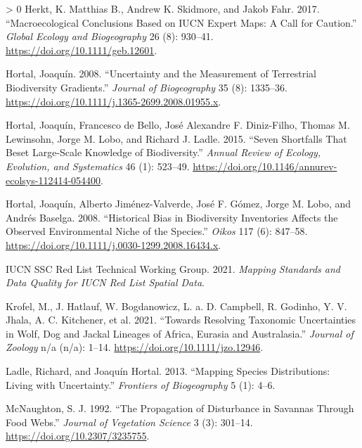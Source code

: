\documentclass[11pt]{article}
\newlength{\cslhangindent}
\newenvironment{CSLReferences}[3] %
 {%
  \setlength{\parindent}{0pt}
  \ifodd #1 \everypar{\setlength{\hangindent}{\cslhangindent}}\ignorespaces\fi
  \ifnum #2 > 0
  \setlength{\parskip}{#2\baselineskip}
  \fi
 }%
 {}
\begin{document}
\begin{CSLReferences}{1}{0}
\leavevmode\hypertarget{ref-Herkt2017MacCon}{}%
Herkt, K. Matthias B., Andrew K. Skidmore, and Jakob Fahr. 2017.
{``Macroecological Conclusions Based on IUCN Expert Maps: A Call for
Caution.''} \emph{Global Ecology and Biogeography} 26 (8): 930--41.
\url{https://doi.org/10.1111/geb.12601}.

\leavevmode\hypertarget{ref-Hortal2008UncMea}{}%
Hortal, Joaquín. 2008. {``Uncertainty and the Measurement of Terrestrial
Biodiversity Gradients.''} \emph{Journal of Biogeography} 35 (8):
1335--36. \url{https://doi.org/10.1111/j.1365-2699.2008.01955.x}.

\leavevmode\hypertarget{ref-Hortal2015SevSho}{}%
Hortal, Joaquín, Francesco de Bello, José Alexandre F. Diniz-Filho,
Thomas M. Lewinsohn, Jorge M. Lobo, and Richard J. Ladle. 2015. {``Seven
Shortfalls That Beset Large-Scale Knowledge of Biodiversity.''}
\emph{Annual Review of Ecology, Evolution, and Systematics} 46 (1):
523--49. \url{https://doi.org/10.1146/annurev-ecolsys-112414-054400}.

\leavevmode\hypertarget{ref-Hortal2008HisBia}{}%
Hortal, Joaquín, Alberto Jiménez-Valverde, José F. Gómez, Jorge M. Lobo,
and Andrés Baselga. 2008. {``Historical Bias in Biodiversity Inventories
Affects the Observed Environmental Niche of the Species.''} \emph{Oikos}
117 (6): 847--58.
\url{https://doi.org/10.1111/j.0030-1299.2008.16434.x}.

\leavevmode\hypertarget{ref-IUCNSSCRedListTechnicalWorkingGroup2021MapSta}{}%
IUCN SSC Red List Technical Working Group. 2021. \emph{Mapping Standards
and Data Quality for IUCN Red List Spatial Data}.

\leavevmode\hypertarget{ref-Krofel2021ResTax}{}%
Krofel, M., J. Hatlauf, W. Bogdanowicz, L. a. D. Campbell, R. Godinho,
Y. V. Jhala, A. C. Kitchener, et al. 2021. {``Towards Resolving
Taxonomic Uncertainties in Wolf, Dog and Jackal Lineages of Africa,
Eurasia and Australasia.''} \emph{Journal of Zoology} n/a (n/a): 1--14.
\url{https://doi.org/10.1111/jzo.12946}.

\leavevmode\hypertarget{ref-Ladle2013MapSpe}{}%
Ladle, Richard, and Joaquín Hortal. 2013. {``Mapping Species
Distributions: Living with Uncertainty.''} \emph{Frontiers of
Biogeography} 5 (1): 4--6.

\leavevmode\hypertarget{ref-McNaughton1992ProDis}{}%
McNaughton, S. J. 1992. {``The Propagation of Disturbance in Savannas
Through Food Webs.''} \emph{Journal of Vegetation Science} 3 (3):
301--14. \url{https://doi.org/10.2307/3235755}.


\end{CSLReferences}
\end{document}
